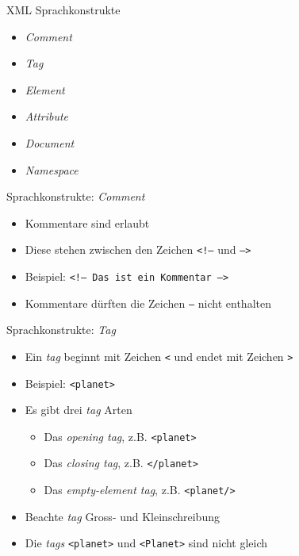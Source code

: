 \documentclass{beamer}
\begin{document}
\begin{frame}{XML Sprachkonstrukte}
	
	\begin{itemize}
		\item \emph{Comment}
		\item \emph{Tag}
		\item \emph{Element}
		\item \emph{Attribute}
		\item \emph{Document}
		\item \emph{Namespace}
	\end{itemize}
	
\end{frame}

\begin{frame}{Sprachkonstrukte: \emph{Comment}}
	
	\begin{itemize}
		\item Kommentare sind erlaubt
		\item Diese stehen zwischen den Zeichen \texttt{<!--} und \texttt{-->}
		\item Beispiel: \texttt{<!-- Das ist ein Kommentar -->}
		\item Kommentare dürften die Zeichen \texttt{--} nicht enthalten
	\end{itemize}
	
\end{frame}

\begin{frame}{Sprachkonstrukte: \emph{Tag}}
	
	\begin{itemize}
		\item Ein \emph{tag} beginnt mit Zeichen \texttt{<} und endet mit Zeichen \texttt{>}
		\item Beispiel: \texttt{<planet>}
		\item Es gibt drei \emph{tag} Arten
		\begin{itemize}
			\item Das \emph{opening tag}, z.B. \texttt{<planet>}
			\item Das \emph{closing tag}, z.B. \texttt{</planet>}
			\item Das \emph{empty-element tag}, z.B. \texttt{<planet/>}
		\end{itemize}
		\item Beachte \emph{tag} Gross- und Kleinschreibung
			\item Die \emph{tags} \texttt{<planet>} und \texttt{<Planet>} sind nicht gleich
	\end{itemize}
	
\end{frame}
\end{document}
